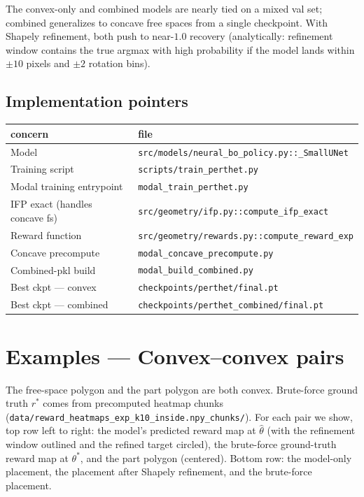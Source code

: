 \documentclass[11pt]{article}
\newcommand{\code}[1]{\texttt{#1}}
\begin{document}
The convex-only and combined models are nearly tied on a mixed val set; combined generalizes to concave free spaces from a single checkpoint.  With Shapely refinement, both push to near-$1.0$ recovery (analytically: refinement window contains the true argmax with high probability if the model lands within $\pm 10$ pixels and $\pm 2$ rotation bins).

\subsection{Implementation pointers}

\begin{center}
\begin{tabular}{ll}
  \toprule
  concern & file \\
  \midrule
  Model                          & \code{src/models/neural\_bo\_policy.py::\_SmallUNet} \\
  Training script                & \code{scripts/train\_perthet.py} \\
  Modal training entrypoint      & \code{modal\_train\_perthet.py} \\
  IFP exact (handles concave fs) & \code{src/geometry/ifp.py::compute\_ifp\_exact} \\
  Reward function                & \code{src/geometry/rewards.py::compute\_reward\_exp} \\
  Concave precompute             & \code{modal\_concave\_precompute.py} \\
  Combined-pkl build             & \code{modal\_build\_combined.py} \\
  Best ckpt --- convex           & \code{checkpoints/perthet/final.pt} \\
  Best ckpt --- combined         & \code{checkpoints/perthet\_combined/final.pt} \\
  \bottomrule
\end{tabular}
\end{center}

\newpage
\section{Examples --- Convex--convex pairs}
The free-space polygon and the part polygon are both convex.  Brute-force ground truth $r^\ast$ comes from precomputed heatmap chunks (\code{data/reward\_heatmaps\_exp\_k10\_inside.npy\_chunks/}). For each pair we show, top row left to right: the model's predicted reward map at $\hat\theta$ (with the refinement window outlined and the refined target circled), the brute-force ground-truth reward map at $\theta^\ast$, and the part polygon (centered).  Bottom row: the model-only placement, the placement after Shapely refinement, and the brute-force placement.
\end{document}
